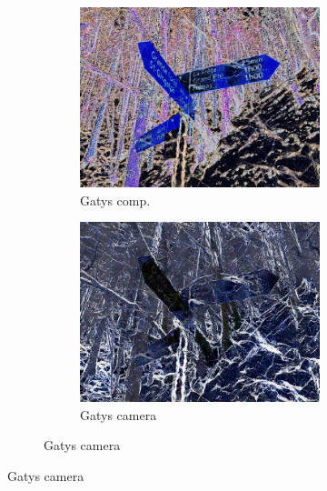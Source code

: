\begin{figure}[]
\begin{subfigure}{\textwidth}
\begin{subfigure}{0.24\textwidth}
        \end{subfigure}
        \hfill
        \begin{subfigure}{0.24\textwidth}
            \centering
            \includegraphics[width=\textwidth]{images/04-experiment02/photo/marble/gatys_im.jpg}
            \caption*{Gatys comp.}
        \end{subfigure}
        \hfill
        \begin{subfigure}{0.24\textwidth}
            \centering
            \includegraphics[width=\textwidth]{images/04-experiment02/photo/marble/gatys_proj.jpg}
            \caption*{Gatys camera}
        \end{subfigure}
        

\end{subfigure}
\end{figure}

